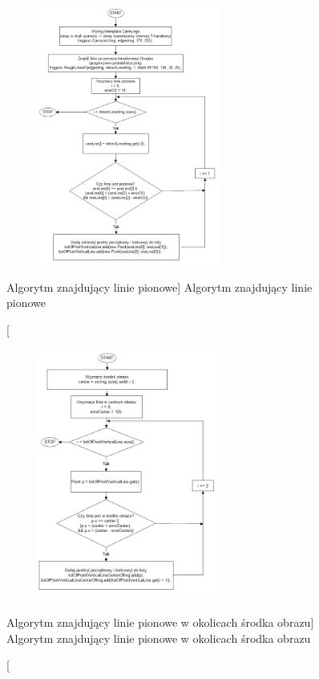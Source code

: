 \documentclass[a4paper,12pt]{article}
\begin{document}
    	        \begin{figure}[!ht]  
    			    \begin{center}
    				    \includegraphics[height=8.5cm, width=8cm]{image//algorithm//divideToPagePred_01.png} 
    			    \end{center}
    			    \caption
        			    [Algorytm znajdujący linie pionowe]  
        			    {Algorytm znajdujący linie pionowe}  
    		    \end{figure}
		
    	        \begin{figure}[!ht]  
    			    \begin{center}
    				    \includegraphics[height=8.25cm, width=8cm]{image//algorithm//divideToPagePred_02.png} 
    			    \end{center}
    			    \caption
        			[Algorytm znajdujący linie pionowe w okolicach środka obrazu]  
        			{Algorytm znajdujący linie pionowe w okolicach środka obrazu}  
    		    \end{figure}
		
\end{document}
